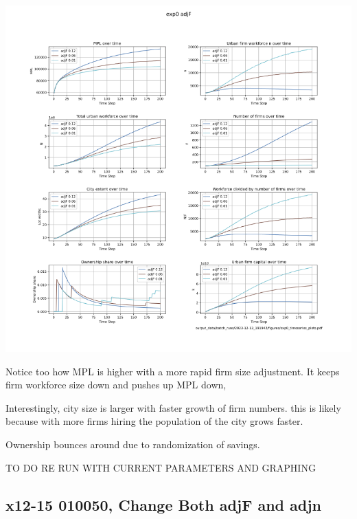 \documentclass{article}
\begin{document}
\includegraphics[scale=.55]{fig/Analysis/AdjF.png}

Notice too how MPL  is higher with a more rapid firm size adjustment. It keeps  firm workforce size down and pushes up MPL down, 

  Interestingly, city size is larger with faster growth of firm numbers. this is likely because with more firms hiring the population of the city grows faster.

  Ownership bounces around due to randomization of savings.


TO DO RE RUN WITH CURRENT PARAMETERS AND GRAPHING
\newpage


 \subsection{x12-15 010050, Change  Both adjF and adjn}
\end{document}
